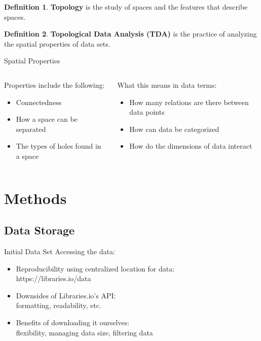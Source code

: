 \documentclass{beamer}
\theoremstyle{definition}
\newtheorem{defn}{Definition}
\theoremstyle{example}
\theoremstyle{conjecture}
\begin{document}
\begin{frame}
\begin{defn}
\textbf{Topology} is the study of spaces and the features that describe spaces.
\end{defn}
\vfill
\begin{defn}
\textbf{Topological Data Analysis (TDA)} is the practice of analyzing the spatial properties of data sets.
\end{defn}
\end{frame}

\begin{frame}{Spatial Properties}
\begin{columns}
\begin{column}{.5\textwidth}
Properties include the following:\\
\begin{itemize}
\item \vphantom{How many relations are there between data points}Connectedness
\item \vphantom{How can data be categorized}How a space can be separated
\item \vphantom{How do the dimensions of data interact}The types of holes found in a space
\end{itemize}
\end{column}
\begin{column}{.5\textwidth}
What this means in data terms:\\
\begin{itemize}
\item \vphantom{Connectedness}How many relations are there between data points
\item How can data be categorized\vphantom{How a space can be separated}
\item \vphantom{The types of holes found in a space}How do the dimensions of data interact
\end{itemize}
\end{column}
\end{columns}
\end{frame}

\section{Methods}
\label{sc.methods}
\subsection{Data Storage}
\label{subsc.storage}
\begin{frame}{Initial Data Set}
Accessing the data:
\begin{itemize}
  \item Reproducibility using centralized location for data:\\
  https://libraries.io/data
  \item Downsides of Libraries.io's API:\\
  formatting, readability, etc.
  \item Benefits of downloading it ourselves:\\
  		flexibility, managing data size, filtering data
\end{itemize}
\end{frame}
\end{document}
